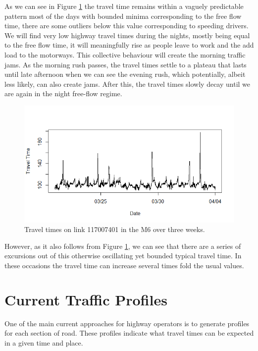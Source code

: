 \documentclass[conference]{IEEEtran}
\begin{document}
As we can see in Figure \ref{fig:travel_time_example} the travel time remains within a vaguely predictable pattern most of the days with bounded minima corresponding to the free flow time, there are some outliers below this value corresponding to speeding drivers. 
We will find very low highway travel times during the nights, mostly being equal to the free flow time, it will meaningfully rise as people leave to work and the add load to the motorways. 
This collective behaviour will create the morning traffic jams. 
As the morning rush passes, the travel times settle to a plateau that lasts until late afternoon when we can see the evening rush, which potentially, albeit less likely, can also create jams. 
After this, the travel times slowly decay until we are again in the night free-flow regime.\\

\begin{figure}[htbp]
	\centerline{\includegraphics[width=\linewidth]{./images/Traveltime_example.png}}
	\caption{Travel times on link 117007401 in the M6 over three weeks.}
	\label{fig:travel_time_example}
\end{figure}

However, as it also follows from Figure \ref{fig:travel_time_example}, we can see that there are a series of excursions out of this otherwise oscillating yet bounded typical travel time. 
In these occasions the travel time can increase several times fold the usual values.
 
\section{Current Traffic Profiles}
One of the main current approaches for highway operators is to generate profiles for each section of road. 
These profiles indicate what travel times can be expected in a given time and place.
\end{document}
